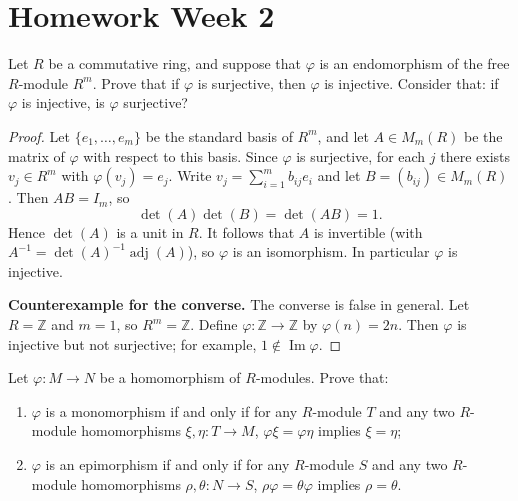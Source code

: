 \section{Homework Week 2}

\begin{exercise}
    Let $R$ be a commutative ring, and suppose that $\varphi$ is an endomorphism of the free $R$-module $R^m$. Prove that if $\varphi$ is surjective, then $\varphi$ is injective. Consider that: if $\varphi$ is injective, is $\varphi$ surjective?
\end{exercise}

\begin{proof}
    Let $\{e_1,\ldots,e_m\}$ be the standard basis of $R^m$, and let $A\in M_m(R)$ be the matrix of $\varphi$ with respect to this basis. Since $\varphi$ is surjective, for each $j$ there exists $v_j\in R^m$ with $\varphi(v_j)=e_j$. Write $v_j=\sum_{i=1}^m b_{ij}e_i$ and let $B=(b_{ij})\in M_m(R)$. Then $AB=I_m$, so
    \[
        \det(A)\det(B)=\det(AB)=1.
    \]
    Hence $\det(A)$ is a unit in $R$. It follows that $A$ is invertible (with $A^{-1}=\det(A)^{-1}\operatorname{adj}(A)$), so $\varphi$ is an isomorphism. In particular $\varphi$ is injective.

    \medskip
    \noindent\textbf{Counterexample for the converse.} The converse is false in general. Let $R = \mathbb{Z}$ and $m = 1$, so $R^m = \mathbb{Z}$. Define $\varphi\colon \mathbb{Z} \to \mathbb{Z}$ by $\varphi(n) = 2n$. Then $\varphi$ is injective but not surjective; for example, $1 \notin \operatorname{Im}\varphi$.
\end{proof}

\begin{exercise}
    Let $\varphi: M \to N$ be a homomorphism of $R$-modules. Prove that:
    \begin{enumerate}
        \item $\varphi$ is a monomorphism if and only if for any $R$-module $T$ and any two $R$-module homomorphisms $\xi, \eta: T \to M$, $\varphi\xi = \varphi\eta$ implies $\xi = \eta$;
        \item $\varphi$ is an epimorphism if and only if for any $R$-module $S$ and any two $R$-module homomorphisms $\rho, \theta: N \to S$, $\rho\varphi = \theta\varphi$ implies $\rho = \theta$.
    \end{enumerate}
\end{exercise}


